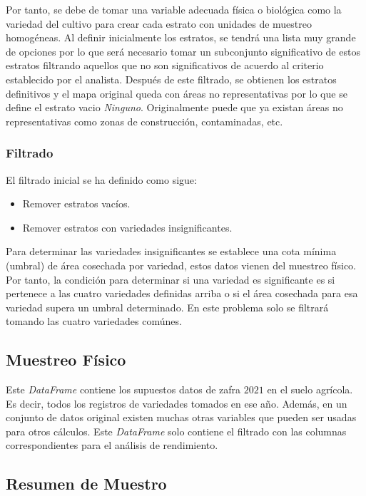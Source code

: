 \documentclass{article}
\begin{document}
\bigbreak

Por tanto, se debe de tomar una variable adecuada física o biológica como la variedad del cultivo para crear cada estrato con unidades de muestreo homogéneas. Al definir inicialmente los estratos, se tendrá una lista muy grande de opciones por lo que será necesario tomar un subconjunto significativo de estos estratos filtrando aquellos que no son significativos de acuerdo al criterio establecido por el analista. Después de este filtrado, se obtienen los estratos definitivos y el mapa original queda con áreas no representativas por lo que se define el estrato vacio \textit{Ninguno}. Originalmente puede que ya existan áreas no representativas como zonas de construcción, contaminadas, etc.

\subsubsection{Filtrado}

El filtrado inicial se ha definido como sigue:

\begin{itemize}
    \item Remover estratos vacíos.
    \item Remover estratos con variedades insignificantes.
\end{itemize}

Para determinar las variedades insignificantes se establece una cota mínima (umbral) de área cosechada por variedad, estos datos vienen del muestreo físico. Por tanto, la condición para determinar si una variedad es significante es si pertenece a las cuatro variedades definidas arriba o si el área cosechada para esa variedad supera un umbral determinado. En este problema solo se filtrará tomando las cuatro variedades comúnes.

\subsection{Muestreo Físico}

Este \textit{DataFrame} contiene los supuestos datos de zafra $2021$ en el suelo agrícola. Es decir, todos los registros de variedades tomados en ese año. Además, en un conjunto de datos original existen muchas otras variables que pueden ser usadas para otros cálculos. Este \textit{DataFrame} solo contiene el filtrado con las columnas correspondientes para el análisis de rendimiento.

\subsection{Resumen de Muestro}
\end{document}

